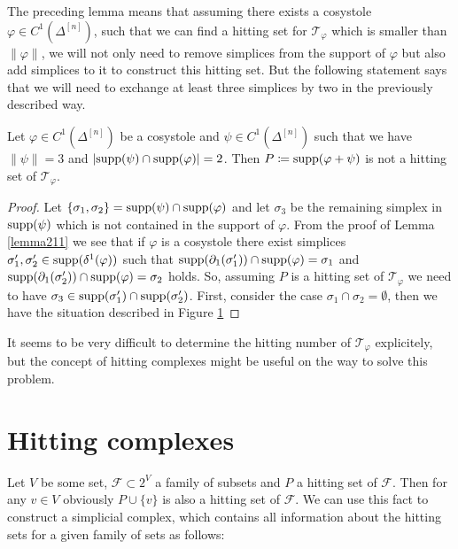 The preceding lemma means that assuming there exists a cosystole \(\varphi\in C^1(\Delta^{[n]})\), such that we can find a hitting set for \(\mathcal{T}_{\varphi}\) which is smaller than \(\|\varphi\|\), we will not only need to remove simplices from the support of \(\varphi\) but also add simplices to it to construct this hitting set. But the following statement says that we will need to exchange at least three simplices by two in the previously described way.

\begin{lem}
Let \(\varphi\in C^1(\Delta^{[n]})\) be a cosystole and \(\psi\in C^1(\Delta^{[n]})\) such that we have\\
\(\|\psi\|=3\) and \(|\mathrm{supp}(\psi)\cap\mathrm{supp}(\varphi)|=2\). Then \(P\coloneqq\mathrm{supp}(\varphi + \psi)\) is not a hitting set of \(\mathcal{T}_{\varphi}\).
\begin{proof}
Let \(\{\sigma_1,\sigma_2\}=\mathrm{supp}(\psi)\cap\mathrm{supp}(\varphi)\) and let \(\sigma_3\) be the remaining simplex in \(\mathrm{supp}(\psi)\) which is not contained in the support of \(\varphi\). From the proof of Lemma \ref{lemma211} we see that if \(\varphi\) is a cosystole there exist simplices \(\sigma'_1,\sigma'_2\in \mathrm{supp}(\delta^1(\varphi))\) such that \(\mathrm{supp}(\partial_1(\sigma'_1))\cap\mathrm{supp}(\varphi)=\sigma_1\) and \(\mathrm{supp}(\partial_1(\sigma'_2))\cap\mathrm{supp}(\varphi)=\sigma_2\) holds. So, assuming \(P\) is a hitting set of \(\mathcal{T}_{\varphi}\) we need to have \(\sigma_3\in\mathrm{supp}(\sigma'_1)\cap\mathrm{supp}(\sigma'_2)\). First, consider the case \(\sigma_1\cap\sigma_2=\emptyset\), then we have the situation described in Figure \ref{} 
\end{proof}
\end{lem}

It seems to be very difficult to determine the hitting number of \(\mathcal{T}_{\varphi}\) explicitely, but the concept of hitting complexes might be useful on the way to solve this problem.

\section{Hitting complexes}

Let \(V\) be some set, \(\mathcal{F}\subset 2^V\) a family of subsets and \(P\) a hitting set of \(\mathcal{F}\). Then for any \(v\in V\) obviously \(P\cup\{v\}\) is also a hitting set of \(\mathcal{F}\). We can use this fact to construct a simplicial complex, which contains all information about the hitting sets for a given family of sets as follows:

